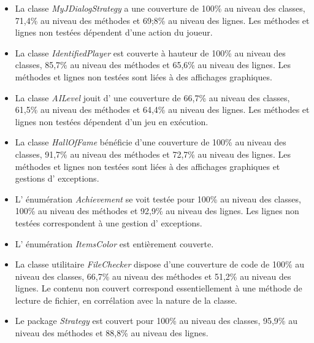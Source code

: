 \documentclass[12pt, openany]{report}
\begin{document}
\begin{itemize}
	\item La classe \mbox{\textit{MyJDialogStrategy}} a une couverture de 100\% au niveau des classes, 71,4\% au niveau des méthodes et 69;8\% au niveau des lignes. Les méthodes et lignes non testées dépendent d'une action du joueur.
	\item La classe \mbox{\textit{IdentifiedPlayer}} est couverte à hauteur de 100\% au niveau des classes, 85,7\% au niveau des méthodes et 65,6\% au niveau des lignes. Les méthodes et lignes non testées sont liées à des affichages graphiques.
	\item La classe \mbox{\textit{AILevel}} jouit d' une couverture de 66,7\% au niveau des classes, 61,5\% au niveau des méthodes et 64,4\% au niveau des lignes. Les méthodes et lignes non testées dépendent d'un jeu en exécution.
	\item La classe \mbox{\textit{HallOfFame}} bénéficie d'une couverture de 100\% au niveau des classes, 91,7\% au niveau des méthodes et 72,7\% au niveau des lignes. Les méthodes et lignes non testées sont liées à des affichages graphiques et gestions d' exceptions.
	\item L' énumération \mbox{\textit{Achievement}} se voit testée pour 100\% au niveau des classes, 100\% au niveau des méthodes et 92,9\% au niveau des lignes. Les lignes non testées correspondent à une gestion d' exceptions.
	\item L' énumération \mbox{\textit{ItemsColor}} est entièrement couverte.
	\item La classe utilitaire \mbox{\textit{FileChecker}} dispose d'une couverture de code de 100\% au niveau des classes, 66,7\% au niveau des méthodes et 51,2\% au niveau des lignes. Le contenu non couvert correspond essentiellement à une méthode de lecture de fichier, en corrélation avec la nature de la classe.
	\item Le package \mbox{\textit{Strategy}} est couvert pour 100\% au niveau des classes, 95,9\% au niveau des méthodes et 88,8\% au niveau des lignes.\\ 
	

\end{itemize}
\end{document}
